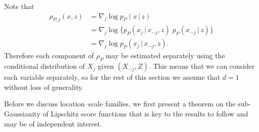 \documentclass[aos]{imsart}
\newcommand{\R}{\mathbb{R}}
\newcommand{\E}{\mathbb{E}}
\newcommand{\given}{\,|\,}
\newtheorem{proposition}[theorem]{Proposition}
\begin{document}
	Note that 
	\begin{align*}
		\rho_{P,j}(x,z)&=\nabla_j \log p_P(x\given  z)\\
		&= \nabla_j \log \{p_P(x_j \given  x_{-j}, z) \; p_P(x_{-j}\given  z)\}\\
		&= \nabla_j \log p_P(x_j \given  x_{-j}, z).
	\end{align*}
	Therefore each component of $\rho_P$ may be estimated separately using the conditional distribution of $X_j$ given $(X_{-j},Z)$. This means that we can consider each variable separately, so for the rest of this section we assume that $d=1$ without loss of generality. 
	
	Before we discuss location--scale families, we first present a theorem on the sub-Gaussianity of Lipschitz  score functions that is key to the results to follow and may be of independent interest.
%	
%	
\end{document}
